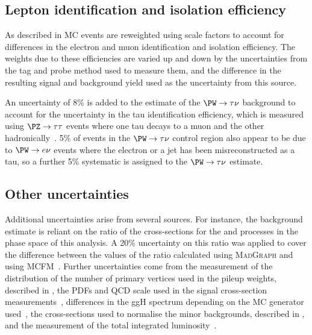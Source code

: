 \subsection{Lepton identification and isolation efficiency}
\label{sec:promptlepweights}
As described in  \ac{MC} events are reweighted using scale factors to account for differences in the electron and muon identification and isolation efficiency. The weights due to these efficiencies are varied up and down by the uncertainties from the tag and probe method used to measure them, and the difference in the resulting signal and background yield used as the uncertainty from this source.

An uncertainty of 8\% is added to the estimate of the $\PW\rightarrow\tau\nu$ background to account for the uncertainty in the tau identification efficiency, which is measured using $\PZ\rightarrow\tau\tau$ events where one tau decays to a muon and the other hadronically~\cite{Chatrchyan:1385560}. 5\% of events in the $\PW\rightarrow\tau\nu$ control region also appear to be due to $\PW\rightarrow e\nu$ events where the electron or a jet has been misreconstructed as a tau, so a further 5\% systematic is assigned to the $\PW\rightarrow\tau\nu$ estimate.


\subsection{Other uncertainties}
\label{sec:promptzextrap}
Additional uncertainties arise from several sources. For instance, the \Znunu background estimate is reliant on the ratio of the cross-sections for the \Znunu and \Zmumu processes in the phase space of this analysis. A 20\% uncertainty on this ratio was applied to cover the difference between the values of the ratio calculated using \textsc{MadGraph} and using \textsc{MCFM}~\cite{ARTICLE:CMSAN-12-403}. Further uncertainties come from the measurement of the distribution of the number of primary vertices used in the pileup weights, described in , the \ac{PDF}s and \ac{QCD} scale used in the signal cross-section measurements~\cite{Dittmaier:2011ti,Dittmaier:2012vm}, differences in the \ac{ggH} \dphijj spectrum depending on the \ac{MC} generator used~\cite{ARTICLE:CMSAN-12-403}, the cross-sections used to normalise the minor backgrounds, described in , and the measurement of the total integrated luminosity~\cite{CMS-PAS-LUM-13-001}.


